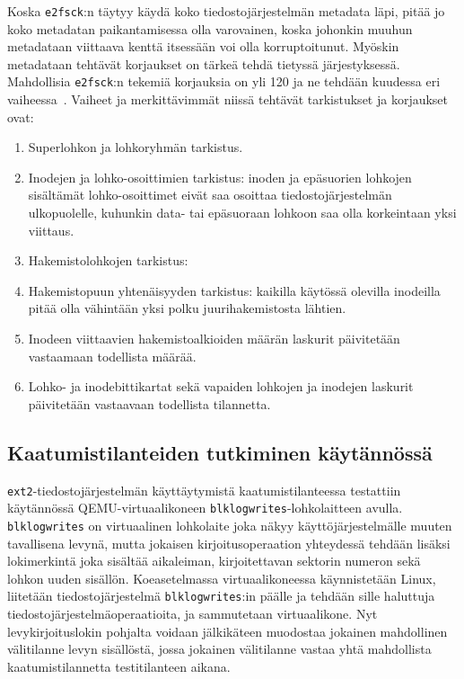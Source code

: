 Koska \texttt{e2fsck}:n täytyy käydä koko tiedostojärjestelmän metadata läpi,
pitää jo koko metadatan paikantamisessa olla varovainen,
koska johonkin muuhun metadataan viittaava kenttä itsessään voi olla korruptoitunut.
Myöskin metadataan tehtävät korjaukset on tärkeä tehdä tietyssä järjestyksessä.
Mahdollisia \texttt{e2fsck}:n tekemiä korjauksia on yli 120 ja ne tehdään kuudessa eri vaiheessa~\cite{SQCK}.
Vaiheet ja merkittävimmät niissä tehtävät tarkistukset ja korjaukset ovat:
\begin{enumerate}
      \item{Superlohkon ja lohkoryhmän tarkistus.}
      \item{Inodejen ja lohko-osoittimien tarkistus:
            inoden ja epäsuorien lohkojen sisältämät lohko-osoittimet eivät saa osoittaa tiedostojärjestelmän ulkopuolelle,
            kuhunkin data- tai epäsuoraan lohkoon saa olla korkeintaan yksi viittaus.}
      \item{Hakemistolohkojen tarkistus: }
      \item{Hakemistopuun yhtenäisyyden tarkistus: kaikilla käytössä olevilla inodeilla pitää olla vähintään yksi polku juurihakemistosta lähtien.}
      \item{Inodeen viittaavien hakemistoalkioiden määrän laskurit päivitetään vastaamaan todellista määrää.}
      \item{Lohko- ja inodebittikartat sekä vapaiden lohkojen ja inodejen laskurit päivitetään vastaavaan todellista tilannetta.}
\end{enumerate}

\subsection{Kaatumistilanteiden tutkiminen käytännössä}
\texttt{ext2}-tiedostojärjestelmän käyttäytymistä kaatumistilanteessa testattiin käytännössä QEMU-virtuaalikoneen \texttt{blk\-log\-writes}-lohkolaitteen avulla.
\texttt{blk\-log\-writes} on virtuaalinen lohkolaite joka näkyy käyttöjärjestelmälle muuten tavallisena levynä,
mutta jokaisen kirjoitusoperaation yhteydessä tehdään lisäksi lokimerkintä joka sisältää aikaleiman, kirjoitettavan sektorin numeron sekä lohkon uuden sisällön.
Koeasetelmassa virtuaalikoneessa käynnistetään Linux,
liitetään tiedostojärjestelmä \texttt{blklogwrites}:in päälle ja tehdään sille haluttuja tiedostojärjestelmäoperaatioita,
ja sammutetaan virtuaalikone.
Nyt levykirjoituslokin pohjalta voidaan jälkikäteen muodostaa jokainen mahdollinen välitilanne levyn sisällöstä,
jossa jokainen välitilanne vastaa yhtä mahdollista kaatumistilannetta testitilanteen aikana.

